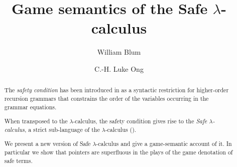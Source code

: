 \documentclass{llncs}
\begin{document}
\frontmatter          %
\pagestyle{headings}  %


\mainmatter              %

\title{Game semantics of the Safe $\lambda$-calculus}



\author{William Blum \and C.-H. Luke Ong}
%
%



\maketitle              %

\newcommand\ialgol{\textsf{IA}}
\newcommand\pcf{\textsf{PCF}}
\newtheorem{thm}{Theorem}
\newtheorem{cor}{Corollary}
\pagestyle{empty}



\begin{abstract}
The \emph{safety condition} has been introduced in \cite{KNU02} as a syntactic
restriction for higher-order recursion grammars that constrains the order
of the variables occurring in the grammar equations.

When transposed to the $\lambda$-calculus, the safety condition gives rise to the \emph{Safe $\lambda$-calculus}, a
strict sub-language of the $\lambda$-calculus (\cite{safety-mirlong2004}).

We present a new version of Safe $\lambda$-calculus and give a game-semantic
account of it. In particular we show that pointers are superfluous in the plays
of the game denotation of safe terms.
\end{abstract}
\end{document}
